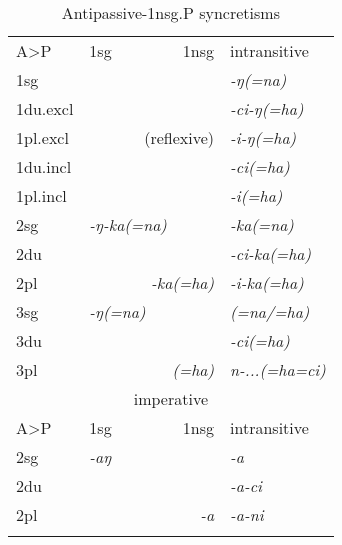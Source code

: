 \noindent
\begin{table}[htp!]
\begin{center}
\begin{tabular}{llll}
 \lsptoprule
 \multicolumn{4}{c}{{\sc indicative}}\\
		\midrule
	A>P	& 	{\sc 1sg}  &	 {\sc 1nsg}  & {\sc intransitive} \\
 \midrule
{\sc 1sg} 	&\multicolumn{2}{r}{}&\it -ŋ(=na)\\
{\sc 1du.excl}  	& \multicolumn{2}{r}{}&\it -ci-ŋ(=ha)\\
{\sc 1pl.excl}	 	&\multicolumn{2}{r}{(reflexive)}&\it -i-ŋ(=ha)\\
{\sc 1du.incl}  	& \multicolumn{2}{r}{}&\it -ci(=ha)\\
{\sc 1pl.incl}  	&	\multicolumn{2}{r}{}&\it -i(=ha)\\
  \midrule
{\sc 2sg}  	&	 \it -ŋ-ka(=na)&\cellcolor[gray]{.8}&\cellcolor[gray]{.8}\it -ka(=na)\\
{\sc 2du}  	&  \multicolumn{2}{r}{\cellcolor[gray]{.8}} &\it -ci-ka(=ha)\\
{\sc 2pl}	 	&  \multicolumn{2}{r}{\cellcolor[gray]{.8}\it -ka(=ha)} &\it -i-ka(=ha)\\
  \midrule			
{\sc 3sg} 	 		& \it -ŋ(=na)&\cellcolor[gray]{.8}&\cellcolor[gray]{.8}\it (=na/=ha)\\
{\sc 3du}	 	&   \multicolumn{2}{r}{\cellcolor[gray]{.8}} &\it -ci(=ha)\\
{\sc 3pl}	 	&  \multicolumn{2}{r}{\cellcolor[gray]{.8}\it (=ha)} &\it n-...(=ha=ci)\\
\midrule
 \multicolumn{4}{c}{{\sc imperative}} \\
\midrule
	A>P	& 	{\sc 1sg}  &	 {\sc 1nsg}  & {\sc intransitive} \\
\midrule
 {\sc 2sg} &\it -aŋ& \cellcolor[gray]{.8}&\cellcolor[gray]{.8}\it -a\\
 {\sc 2du} & \multicolumn{2}{r}{\cellcolor[gray]{.8}} &\it -a-ci\\
 {\sc 2pl}&\multicolumn{2}{r}{\cellcolor[gray]{.8}\it -a}&\it  -a-ni\\
\lspbottomrule
\end{tabular}
\end{center}
\caption{Antipassive-{\sc 1nsg.P} syncretisms}\label{antip-tab}
\end{table}


